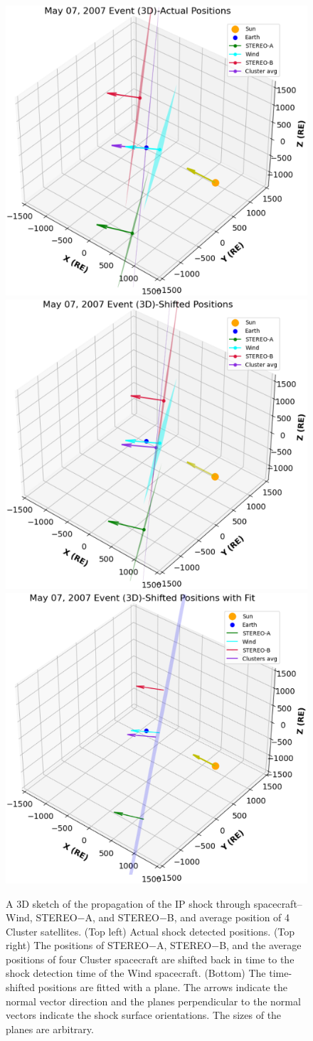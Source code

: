 \documentclass[draft]{agujournal2019}
\begin{document}
\begin{figure}
\includegraphics[width=.35\linewidth]{jgr-2023-ipshocks-f17a.eps}
\includegraphics[width=.35\linewidth]{jgr-2023-ipshocks-f17b.eps} 
\includegraphics[width=.35\linewidth]{jgr-2023-ipshocks-f17c.eps}
\caption{A 3D sketch of the propagation of the IP shock through spacecraft-- Wind, STEREO$-$A, and STEREO$-$B, and average position of 4 Cluster satellites. (Top left) Actual shock detected positions. (Top right) The positions of STEREO$-$A, STEREO$-$B, and the average positions of four Cluster spacecraft are shifted back in time to the shock detection time of the Wind spacecraft. (Bottom) The time-shifted positions are fitted with a plane. The arrows indicate the normal vector direction and the planes perpendicular to the normal vectors indicate the shock surface orientations. The sizes of the planes are arbitrary.\label{fig:05073D}}
\end{figure}

\pagebreak
\end{document}
